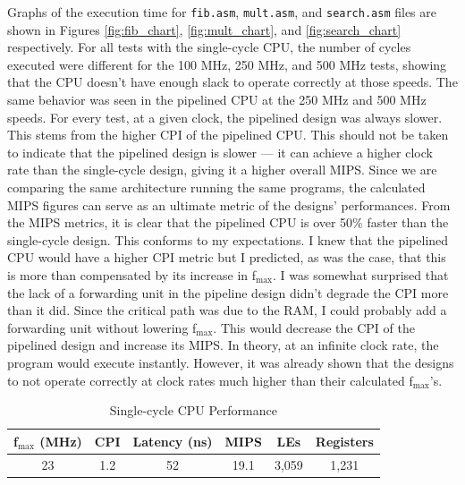 \documentclass[12pt]{article}
\begin{document}
Graphs of the execution time for \texttt{fib.asm}, \texttt{mult.asm}, and \texttt{search.asm} files are shown in Figures \ref{fig:fib_chart}, \ref{fig:mult_chart}, and \ref{fig:search_chart} respectively. For all tests with the single-cycle CPU, the number of cycles executed were different for the 100 MHz, 250 MHz, and 500 MHz tests, showing that the CPU doesn't have enough slack to operate correctly at those speeds. The same behavior was seen in the pipelined CPU at the 250 MHz and 500 MHz speeds. For every test, at a given clock, the pipelined design was always slower. This stems from the higher CPI of the pipelined CPU. This should not be taken to indicate that the pipelined design is slower --- it can achieve a higher clock rate than the single-cycle design, giving it a higher overall MIPS. Since we are comparing the same architecture running the same programs, the calculated MIPS figures can serve as an ultimate metric of the designs' performances. From the MIPS metrics, it is clear that the pipelined CPU is over 50\% faster than the single-cycle design. This conforms to my expectations. I knew that the pipelined CPU would have a higher CPI metric but I predicted, as was the case, that this is more than compensated by its increase in f$_{\textrm{max}}$. I was somewhat surprised that the lack of a forwarding unit in the pipeline design didn't degrade the CPI more than it did. Since the critical path was due to the RAM, I could probably add a forwarding unit without lowering f$_{\textrm{max}}$. This would decrease the CPI of the pipelined design and increase its MIPS. In theory, at an infinite clock rate, the program would execute instantly. However, it was already shown that the designs to not operate correctly at clock rates much higher than their calculated f$_{\textrm{max}}$'s.\\

\begin{table}
\begin{center}

  \caption{Single-cycle CPU Performance}
  \begin{tabular}{| c | c | c | c | c | c |}
  \hline
  f$_{\textrm{max}}$ (MHz) & CPI & Latency (ns) & MIPS & LEs & Registers \\ \hline
 23 & 1.2 & 52 & 19.1 & 3,059 & 1,231 \\ \hline
  \end{tabular}
  \end{center}

  \label{tab:single}
\end{table}
\end{document}
